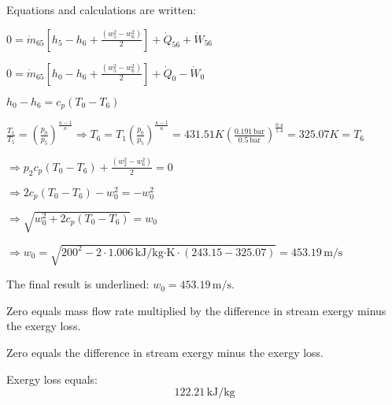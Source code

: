Equations and calculations are written:  

\( 0 = \dot{m}_{65} \left[ h_5 - h_6 + \frac{(w_5^2 - w_6^2)}{2} \right] + \dot{Q}_{56} + \dot{W}_{56} \)  

\( 0 = \dot{m}_{65} \left[ h_0 - h_6 + \frac{(w_5^2 - w_6^2)}{2} \right] + \dot{Q}_{0} - \dot{W}_{0} \)  

\( h_0 - h_6 = c_p (T_0 - T_6) \)  

\( \frac{T_1}{T_5} = \left( \frac{p_0}{p_5} \right)^{\frac{\kappa - 1}{\kappa}} \Rightarrow T_6 = T_1 \left( \frac{p_0}{p_5} \right)^{\frac{\kappa - 1}{\kappa}} = 431.51 K \left( \frac{0.191 \, \text{bar}}{0.5 \, \text{bar}} \right)^{\frac{0.4}{1.4}} = 325.07 K = T_6 \)  

\( \Rightarrow p_2 c_p (T_0 - T_6) + \frac{(w_2^2 - w_6^2)}{2} = 0 \)  

\( \Rightarrow 2 c_p (T_0 - T_6) - w_0^2 = -w_0^2 \)  

\( \Rightarrow \sqrt{w_0^2 + 2 c_p (T_0 - T_6)} = w_0 \)  

\( \Rightarrow w_0 = \sqrt{200^2 - 2 \cdot 1.006 \, \text{kJ/kg·K} \cdot (243.15 - 325.07)} = 453.19 \, \text{m/s} \)  

The final result is underlined: \( w_0 = 453.19 \, \text{m/s} \).

Zero equals mass flow rate multiplied by the difference in stream exergy minus the exergy loss.  

Zero equals the difference in stream exergy minus the exergy loss.  

Exergy loss equals:  
\[ 122.21 \, \text{kJ/kg} \]